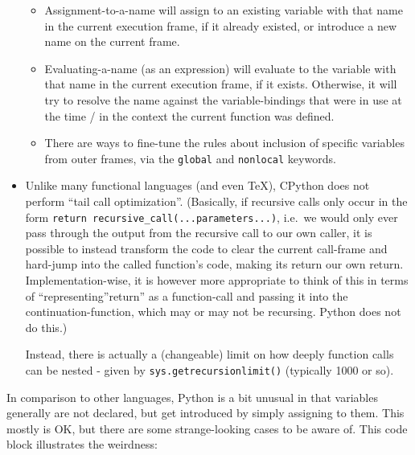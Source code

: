 \documentclass[11pt]{article}
\providecommand{\tightlist}{%
      \setlength{\itemsep}{0pt}\setlength{\parskip}{0pt}}
\begin{document}
\begin{itemize}
  \begin{itemize}
  \tightlist
  \item
    Assignment-to-a-name will assign to an existing variable with that
    name in the current execution frame, if it already existed, or
    introduce a new name on the current frame.
  \item
    Evaluating-a-name (as an expression) will evaluate to the variable
    with that name in the current execution frame, if it exists.
    Otherwise, it will try to resolve the name against the
    variable-bindings that were in use at the time / in the context the
    current function was defined.
  \item
    There are ways to fine-tune the rules about inclusion of specific
    variables from outer frames, via the \texttt{global} and
    \texttt{nonlocal} keywords.
  \end{itemize}
\item
  Unlike many functional languages (and even TeX), CPython does not
  perform ``tail call optimization''. (Basically, if recursive calls
  only occur in the form
  \texttt{return\ recursive\_call(...parameters...)}, i.e.~we would only
  ever pass through the output from the recursive call to our own
  caller, it is possible to instead transform the code to clear the
  current call-frame and hard-jump into the called function's code,
  making its return our own return. Implementation-wise, it is however
  more appropriate to think of this in terms of ``representing''return''
  as a function-call and passing it into the continuation-function,
  which may or may not be recursing. Python does not do this.)

  Instead, there is actually a (changeable) limit on how deeply function
  calls can be nested - given by \texttt{sys.getrecursionlimit()}
  (typically 1000 or so).
\end{itemize}

In comparison to other languages, Python is a bit unusual in that
variables generally are not declared, but get introduced by simply
assigning to them. This mostly is OK, but there are some strange-looking
cases to be aware of. This code block illustrates the weirdness:
\end{document}
